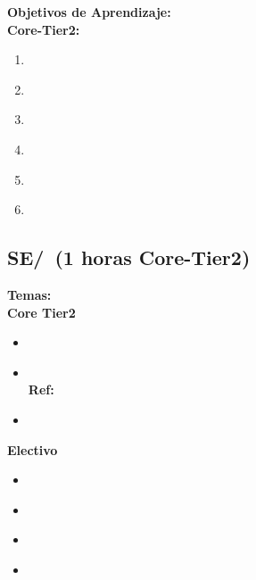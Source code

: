 \noindent \textbf{Objetivos de Aprendizaje:}\\
\noindent \textbf{Core-Tier2:}
\begin{enumerate}
	\setcounter{enumi}{0}
	\item \SESoftwareEvolutionLOIdentifyTheAssociatedEvolution\xspace[\SESoftwareEvolutionLOIdentifyTheAssociatedEvolutionLevel]\label{sec:BOK:SESoftwareEvolutionLOIdentifyTheAssociatedEvolution}
	\item \SESoftwareEvolutionLOEstimateTheA\xspace[\SESoftwareEvolutionLOEstimateTheALevel]\label{sec:BOK:SESoftwareEvolutionLOEstimateTheA}
	\item \SESoftwareEvolutionLOUseRefactoring\xspace[\SESoftwareEvolutionLOUseRefactoringLevel]\label{sec:BOK:SESoftwareEvolutionLOUseRefactoring}
	\item \SESoftwareEvolutionLODiscussTheEvolving\xspace[\SESoftwareEvolutionLODiscussTheEvolvingLevel]\label{sec:BOK:SESoftwareEvolutionLODiscussTheEvolving}
	\item \SESoftwareEvolutionLOOutlineTheRegression\xspace[\SESoftwareEvolutionLOOutlineTheRegressionLevel]\label{sec:BOK:SESoftwareEvolutionLOOutlineTheRegression}
	\item \SESoftwareEvolutionLODiscussTheDisadvantagesTypes\xspace[\SESoftwareEvolutionLODiscussTheDisadvantagesTypesLevel]\label{sec:BOK:SESoftwareEvolutionLODiscussTheDisadvantagesTypes}
\end{enumerate}


\subsection{SE/\SESoftwareReliability~(1 horas Core-Tier2)}\label{sec:BOK:SESoftwareReliability}
\noindent \textbf{Temas:}\\
\noindent \textbf{Core Tier2}
\begin{itemize}
	\item \SESoftwareReliabilityTopicSoftwareReliability\label{sec:BOK:SESoftwareReliabilityTopicSoftwareReliability}
	\item \SESoftwareReliabilityTopicSoftwareReliabilitySystem\xspace \\ \textbf{Ref:} \label{sec:BOK:SESoftwareReliabilityTopicSoftwareReliabilitySystem}
	\item \SESoftwareReliabilityTopicFault\label{sec:BOK:SESoftwareReliabilityTopicFault}
\end{itemize}

\noindent \textbf{Electivo}
\begin{itemize}
	\item \SESoftwareReliabilityTopicSoftwareReliabilityModels\label{sec:BOK:SESoftwareReliabilityTopicSoftwareReliabilityModels}
	\item \SESoftwareReliabilityTopicSoftwareFault\label{sec:BOK:SESoftwareReliabilityTopicSoftwareFault}
	\item \SESoftwareReliabilityTopicSoftwareReliabilityEngineering\label{sec:BOK:SESoftwareReliabilityTopicSoftwareReliabilityEngineering}
	\item \SESoftwareReliabilityTopicMeasurement\label{sec:BOK:SESoftwareReliabilityTopicMeasurement}
\end{itemize}


